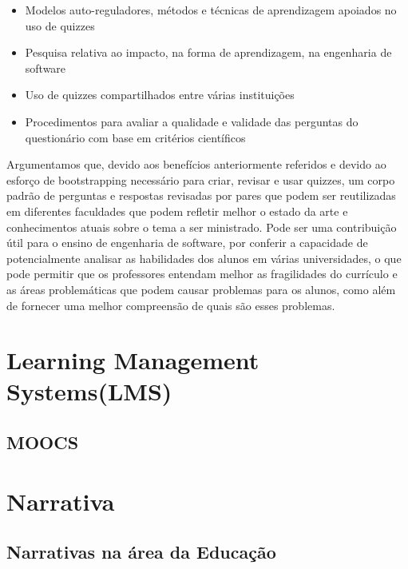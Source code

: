 \begin{itemize}
    \item Modelos auto-reguladores, métodos e técnicas de aprendizagem apoiados no uso de quizzes
    \item Pesquisa relativa ao impacto, na forma de aprendizagem, na engenharia de software
    \item Uso de quizzes compartilhados entre várias instituições
    \item Procedimentos para avaliar a qualidade e validade das perguntas do questionário com base em critérios científicos
\end{itemize}

Argumentamos que, devido aos benefícios anteriormente referidos e devido ao esforço de bootstrapping necessário para criar, revisar e usar quizzes, um corpo padrão de perguntas e respostas revisadas por pares que podem ser reutilizadas em diferentes faculdades que podem refletir melhor o estado da arte e conhecimentos atuais sobre o tema a ser ministrado. Pode ser uma contribuição útil para o ensino de engenharia de software, por conferir a capacidade de potencialmente analisar as habilidades dos alunos em várias universidades, o que pode permitir que os professores entendam melhor as fragilidades do currículo e as áreas problemáticas que podem causar problemas para os alunos, como além de fornecer uma melhor compreensão de quais são esses problemas.


\section{Learning Management Systems(LMS)}

\subsection{MOOCS}


\section{Narrativa}

\subsection{Narrativas na área da Educação}
